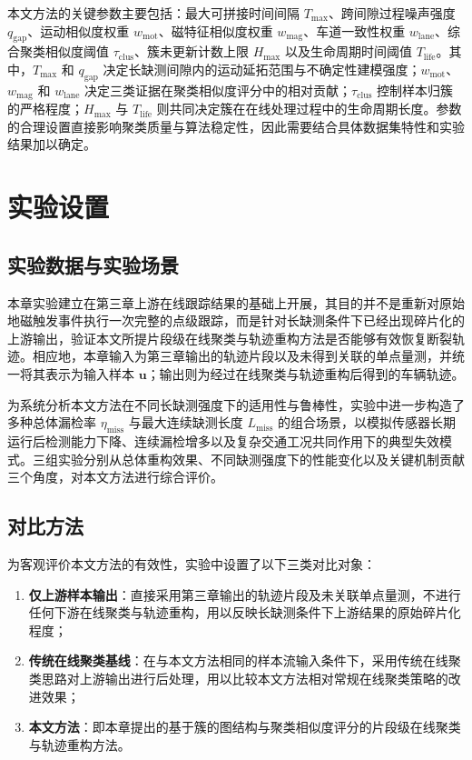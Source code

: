 \documentclass{xdupgthesis}
\begin{document}
本文方法的关键参数主要包括：最大可拼接时间间隔 $T_{\max}$、跨间隙过程噪声强度 $q_{\mathrm{gap}}$、运动相似度权重 $w_{\mathrm{mot}}$、磁特征相似度权重 $w_{\mathrm{mag}}$、车道一致性权重 $w_{\mathrm{lane}}$、综合聚类相似度阈值 $\tau_{\mathrm{clus}}$、簇未更新计数上限 $H_{\max}$ 以及生命周期时间阈值 $T_{\mathrm{life}}$。其中，$T_{\max}$ 和 $q_{\mathrm{gap}}$ 决定长缺测间隙内的运动延拓范围与不确定性建模强度；$w_{\mathrm{mot}}$、$w_{\mathrm{mag}}$ 和 $w_{\mathrm{lane}}$ 决定三类证据在聚类相似度评分中的相对贡献；$\tau_{\mathrm{clus}}$ 控制样本归簇的严格程度；$H_{\max}$ 与 $T_{\mathrm{life}}$ 则共同决定簇在在线处理过程中的生命周期长度。参数的合理设置直接影响聚类质量与算法稳定性，因此需要结合具体数据集特性和实验结果加以确定。

\section{实验设置}

\subsection{实验数据与实验场景}

本章实验建立在第三章上游在线跟踪结果的基础上开展，其目的并不是重新对原始地磁触发事件执行一次完整的点级跟踪，而是针对长缺测条件下已经出现碎片化的上游输出，验证本文所提片段级在线聚类与轨迹重构方法是否能够有效恢复断裂轨迹。相应地，本章输入为第三章输出的轨迹片段以及未得到关联的单点量测，并统一将其表示为输入样本 $\mathbf{u}$；输出则为经过在线聚类与轨迹重构后得到的车辆轨迹。

为系统分析本文方法在不同长缺测强度下的适用性与鲁棒性，实验中进一步构造了多种总体漏检率 $\eta_{\mathrm{miss}}$ 与最大连续缺测长度 $L_{\mathrm{miss}}$ 的组合场景，以模拟传感器长期运行后检测能力下降、连续漏检增多以及复杂交通工况共同作用下的典型失效模式。三组实验分别从总体重构效果、不同缺测强度下的性能变化以及关键机制贡献三个角度，对本文方法进行综合评价。

\subsection{对比方法}

为客观评价本文方法的有效性，实验中设置了以下三类对比对象：

\begin{enumerate}
	\item \textbf{仅上游样本输出}：直接采用第三章输出的轨迹片段及未关联单点量测，不进行任何下游在线聚类与轨迹重构，用以反映长缺测条件下上游结果的原始碎片化程度；
	\item \textbf{传统在线聚类基线}：在与本文方法相同的样本流输入条件下，采用传统在线聚类思路对上游输出进行后处理，用以比较本文方法相对常规在线聚类策略的改进效果；
	\item \textbf{本文方法}：即本章提出的基于簇的图结构与聚类相似度评分的片段级在线聚类与轨迹重构方法。
\end{enumerate}
\end{document}
